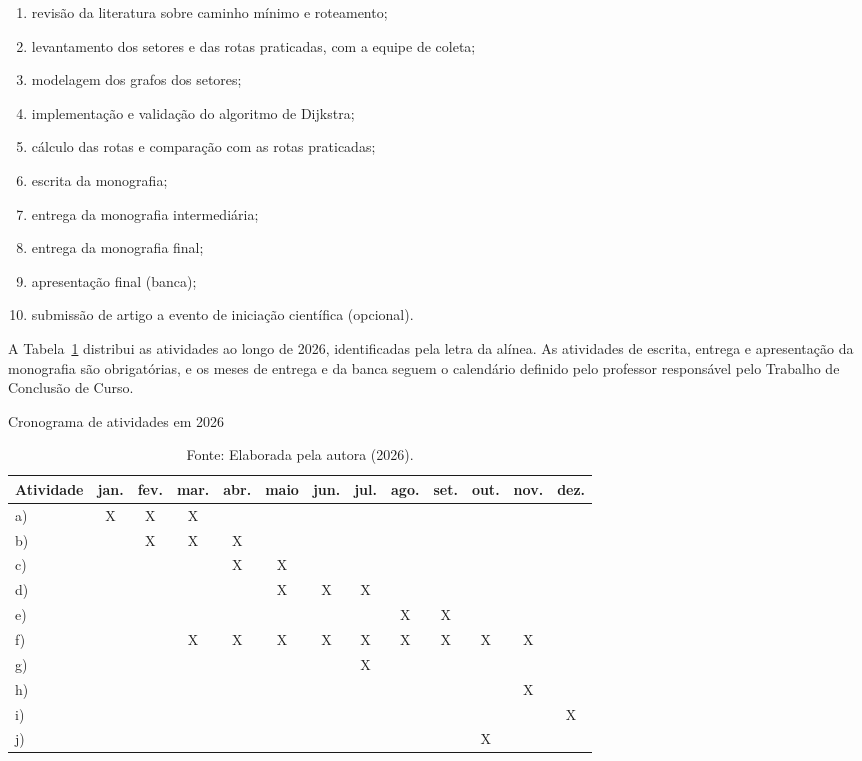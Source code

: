 \documentclass[tcc-proposta]{texufpel}
\begin{document}
\begin{enumerate}
  \item revisão da literatura sobre caminho mínimo e roteamento;
  \item levantamento dos setores e das rotas praticadas, com a equipe de
        coleta;
  \item modelagem dos grafos dos setores;
  \item implementação e validação do algoritmo de Dijkstra;
  \item cálculo das rotas e comparação com as rotas praticadas;
  \item escrita da monografia;
  \item entrega da monografia intermediária;
  \item entrega da monografia final;
  \item apresentação final (banca);
  \item submissão de artigo a evento de iniciação científica (opcional).
\end{enumerate}

A Tabela~\ref{tab:cronograma} distribui as atividades ao longo de 2026,
identificadas pela letra da alínea. As
atividades de escrita, entrega e apresentação da monografia são obrigatórias,
e os meses de entrega e da banca seguem o calendário definido pelo professor
responsável pelo Trabalho de Conclusão de Curso.

\begin{table}[htbp]
  \caption{Cronograma de atividades em 2026}
  \label{tab:cronograma}
  \centering
  \setlength{\tabcolsep}{4pt}
  \begin{tabular}{l*{12}{c}}
    \hline
    Atividade & jan. & fev. & mar. & abr. & maio & jun. & jul. & ago. & set. & out. & nov. & dez. \\
    \hline
    a) & X & X & X &   &   &   &   &   &   &   &   &   \\
    b) &   & X & X & X &   &   &   &   &   &   &   &   \\
    c) &   &   &   & X & X &   &   &   &   &   &   &   \\
    d) &   &   &   &   & X & X & X &   &   &   &   &   \\
    e) &   &   &   &   &   &   &   & X & X &   &   &   \\
    f) &   &   & X & X & X & X & X & X & X & X & X &   \\
    g) &   &   &   &   &   &   & X &   &   &   &   &   \\
    h) &   &   &   &   &   &   &   &   &   &   & X &   \\
    i) &   &   &   &   &   &   &   &   &   &   &   & X \\
    j) &  &   &   &   &   &   &   &   &   & X &   &   \\
    \hline
  \end{tabular}
  \caption*{Fonte: Elaborada pela autora (2026).}
\end{table}
\end{document}
